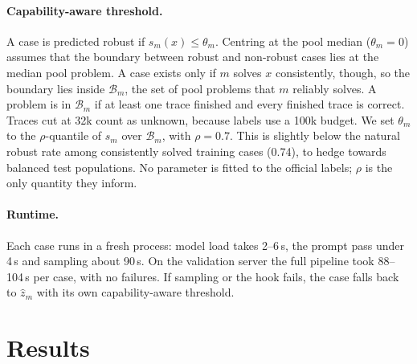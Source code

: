 \documentclass{article}
\begin{document}
\paragraph{Capability-aware threshold.}
\label{sec:threshold}
A case is predicted robust if $s_m(x) \le \theta_m$.
Centring at the pool median ($\theta_m = 0$) assumes that the boundary between robust and non-robust cases lies at the median pool problem.
A case exists only if $m$ solves $x$ consistently, though, so the boundary lies inside $\mathcal{B}_m$, the set of pool problems that $m$ reliably solves.
A problem is in $\mathcal{B}_m$ if at least one trace finished and every finished trace is correct.
Traces cut at 32k count as unknown, because labels use a 100k budget.
We set $\theta_m$ to the $\rho$-quantile of $s_m$ over $\mathcal{B}_m$, with $\rho = 0.7$.
This is slightly below the natural robust rate among consistently solved training cases (0.74), to hedge towards balanced test populations.
No parameter is fitted to the official labels; $\rho$ is the only quantity they inform.

\paragraph{Runtime.}
Each case runs in a fresh process: model load takes 2--6\,s, the prompt pass under 4\,s and sampling about 90\,s.
On the validation server the full pipeline took 88--104\,s per case, with no failures.
If sampling or the hook fails, the case falls back to $\hat z_m$ with its own capability-aware threshold.

\section{Results}
\label{sec:results}
\end{document}
